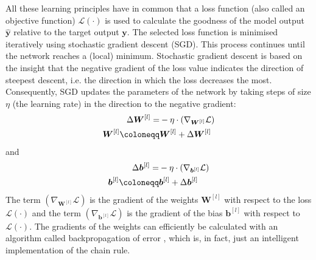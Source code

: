 All these learning principles have in common that a loss function \cite{wang_comprehensive_2022} (also called an objective function) $\mathcal{L}(\cdot)$ is used to calculate the goodness of the model output $\boldsymbol{\hat{y}}$ relative to the target output ${\boldsymbol{y}}$.
The selected loss function is minimised iteratively using stochastic gradient descent (SGD). This process continues until the network reaches a (local) minimum.
Stochastic gradient descent is based on the insight that the negative gradient of the loss value indicates the direction of steepest descent, i.e. the direction in which the loss decreases the most. Consequently, SGD updates the parameters of the network by taking steps of size $\eta$ (the learning rate) in the direction to the negative gradient:
%
\begin{align}\eqlbl{sgd}
	\begin{aligned}
		\Delta \boldsymbol{W}^{[l]} = & -\eta \cdot \left( \nabla_{\boldsymbol{W}^{[l]}} \mathcal{L} \right)\\
		\boldsymbol{W}^{[l]} \coloneqq & \boldsymbol{W}^{[l]} + \Delta \boldsymbol{W}^{[l]}
	\end{aligned}
\end{align}
%
and
%	
\begin{align}\eqlbl{sgd2}	
	\begin{aligned}
		\Delta \boldsymbol{b}^{[l]} = & -\eta \cdot \left( \nabla_{\boldsymbol{b}^{[l]}} \mathcal{L} \right)\\
		\boldsymbol{b}^{[l]} \coloneqq & \boldsymbol{b}^{[l]} + \Delta \boldsymbol{b}^{[l]}
	\end{aligned}
\end{align}
%
The term $\left( \nabla_{\boldsymbol{W}^{[l]}} \mathcal{L} \right)$ is the gradient of the weights $\boldsymbol{W}^{[l]}$  with respect to the loss $\mathcal{L}(\cdot)$ and the term $\left( \nabla_{\boldsymbol{b}^{[l]}} \mathcal{L} \right)$ is the gradient of the bias \(\boldsymbol{b}^{[l]}\)  with respect to $\mathcal{L}(\cdot)$.
The gradients of the weights can efficiently be calculated with an algorithm called backpropagation of error , which is, in fact, just an intelligent implementation of the chain rule.


